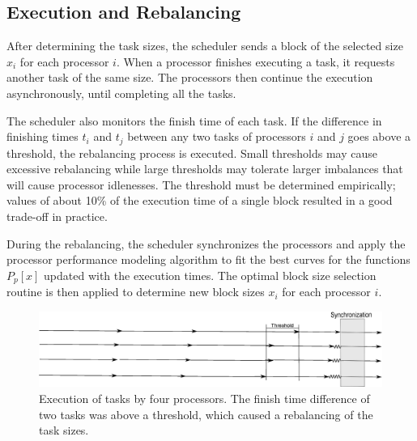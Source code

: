 \documentclass[journal]{IEEEtran}
\begin{document}
\subsection{Execution and Rebalancing}
After determining the task sizes, the scheduler sends a block of the selected
size $x_i$ for each processor $i$. When a processor finishes executing a task,
it requests another task of the same size. The processors then continue the
execution asynchronously, until completing all the tasks.

The scheduler also monitors the finish time of each task. If the difference in
finishing times $t_i$ and $t_j$ between any two tasks of processors $i$ and $j$
goes above a threshold, the rebalancing process is executed. Small thresholds
may cause excessive rebalancing while large thresholds may tolerate larger
imbalances that will cause processor idlenesses. The threshold must be
determined empirically; values of about 10\% of the execution time of a single
block resulted in a good trade-off in practice.


During the rebalancing, the scheduler synchronizes the processors and apply the
processor performance modeling algorithm to fit the best curves for the
functions $P_p[x]$ updated with the execution times. The optimal block size
selection routine is then applied to determine new block sizes $x_i$ for each
processor $i$.

\begin{figure}[!t]
	\centering
			\includegraphics[scale=0.22]{DiagramaArtigo.eps}
	\caption{Execution of tasks by four processors. The finish time
         difference of two tasks was above a threshold, which caused a
          rebalancing of the task sizes.}
	\label{fig:Diagrama}
\end{figure}

\end{document}
